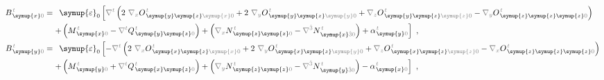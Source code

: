 \begin{subequations}
\begin{align}
	B^{\;\!\mathcolor{gray}{t}}_{\;\! \symup{x}\mathcolor{gray}{0}} = &\hphantom{+} {\symup{\varepsilon}}_0 \left[ \mathcolor{gray}{\nabla^t} \left( 2~ \mathcolor{gray}{\nabla_x} O^{\;\!\mathcolor{gray}{t}}_{\;\! \symup{y} \symup{z} \mathcolor{gray}{\symup{x}} \mathcolor{gray}{0}} + 2~ \mathcolor{gray}{\nabla_y} O^{\;\!\mathcolor{gray}{t}}_{\;\! \symup{y} \symup{z} \mathcolor{gray}{\symup{y}} \mathcolor{gray}{0}} + \mathcolor{gray}{\nabla_z} O^{\;\!\mathcolor{gray}{t}}_{\;\! \symup{y} \symup{z} \mathcolor{gray}{\symup{z}} \mathcolor{gray}{0}} - \mathcolor{gray}{\nabla_y} O^{\;\!\mathcolor{gray}{t}}_{\;\! \symup{z} \symup{z} \symup{z} \mathcolor{gray}{0}} \right) \right. \label{eq:B_x0=} \\ & \left. + \left( M^{\;\!\mathcolor{gray}{t}}_{\;\! \symup{x}\mathcolor{gray}{0}} - \mathcolor{gray}{\nabla^t} Q^{\;\!\mathcolor{gray}{t}}_{\;\! \symup{y} \symup{z} \mathcolor{gray}{0}} \right) +
	\left( \mathcolor{gray}{\nabla_x} N^{\;\!\mathcolor{gray}{t}}_{\;\!\symup{z} \symup{z} \mathcolor{gray}{0}} - \mathcolor{gray}{\nabla^{\hat{3}}} N^{\;\!\mathcolor{gray}{t}}_{\;\!\symup{x} \mathcolor{gray}{\hat{3}} \mathcolor{gray}{0}} \right) + 
	{\alpha}^{\;\!\mathcolor{gray}{t}}_{\;\! \symup{y}\mathcolor{gray}{0}} \right]~, \\
	B^{\;\!\mathcolor{gray}{t}}_{\;\! \symup{y}\mathcolor{gray}{0}} = &\hphantom{+} {\symup{\varepsilon}}_0 \left[ - \mathcolor{gray}{\nabla^t} \left( 2~ \mathcolor{gray}{\nabla_x} O^{\;\!\mathcolor{gray}{t}}_{\;\! \symup{x} \symup{z} \mathcolor{gray}{\symup{x}} \mathcolor{gray}{0}} + 2~ \mathcolor{gray}{\nabla_y}  O^{\;\!\mathcolor{gray}{t}}_{\;\! \symup{x} \symup{z} \mathcolor{gray}{\symup{y}} \mathcolor{gray}{0}} + \mathcolor{gray}{\nabla_z}  O^{\;\!\mathcolor{gray}{t}}_{\;\! \symup{x} \symup{z} \mathcolor{gray}{\symup{z}} \mathcolor{gray}{0}} - \mathcolor{gray}{\nabla_x}  O^{\;\!\mathcolor{gray}{t}}_{\;\! \symup{z} \symup{z} \symup{z} \mathcolor{gray}{0}} \right) \right. \label{eq:B_y0=} \\ & \left. + \left( M^{\;\!\mathcolor{gray}{t}}_{\;\! \symup{y}\mathcolor{gray}{0}} + \mathcolor{gray}{\nabla^t} Q^{\;\!\mathcolor{gray}{t}}_{\;\! \symup{x} \symup{z} \mathcolor{gray}{0}} \right) +
	\left( \mathcolor{gray}{\nabla_y} N^{\;\!\mathcolor{gray}{t}}_{\;\! \symup{z} \symup{z} \mathcolor{gray}{0}} - \mathcolor{gray}{\nabla^{\hat{3}}} N^{\;\!\mathcolor{gray}{t}}_{\;\! \symup{y} \mathcolor{gray}{\hat{3}} \mathcolor{gray}{0}} \right) - 
	{\alpha}^{\;\!\mathcolor{gray}{t}}_{\;\! \symup{x}\mathcolor{gray}{0}} \right]~, \\

\end{align}
\end{subequations}
